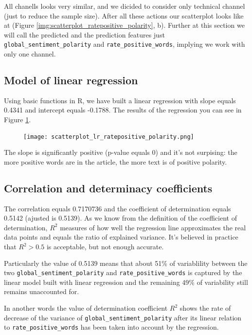 All chanells looks very similar, and we dicided to consider only technical channel (just to reduce the sample size). After all these actions our scatterplot looks like at (Figure \ref{img:scatterplot_ratepositive_polarity}, b). Further at this section we will call the predicted and the prediction features just \texttt{global\_sentiment\_polarity} and \texttt{rate\_positive\_words}, implying we work with only one channel.
 
\subsection{Model of linear regression}

Using basic functions in R, we have built a linear regression with slope equals 0.4341 and intercept equals  -0.1788. The results of the regression you can see in Figure \ref{img:scatterplot_lr_ratepositive_polarity}.

\begin{figure}[h!]
 \begin{center}
    \center \texttt{[image: scatterplot\_lr\_ratepositive\_polarity.png]}
   \caption{}
   \label{img:scatterplot_lr_ratepositive_polarity}
 \end{center}
\end{figure} 

The slope is significantly positive (p-value equals 0) and it's not surpising: the more positive words are in the article, the more text is of positive polarity.

\subsection{Correlation and determinacy coefficients}

The correlation equals 0.7170736 and the coefficient of determination equals 0.5142 (ajusted is 0.5139). As we know from the definition of the coefficient of determination, $R^2$ measures of how well the regression line approximates the real data points and equals the ratio of explained variance. It's believed in practice that $R^2 > 0.5$ is acceptable, but not enough accurate. 

Particularly the value of 0.5139 means that about 51\% of variablility between the two   \texttt{global\_sentiment\_polarity} and \texttt{rate\_positive\_words} is captured by the linear model built with linear regression and the remaining 49\% of variability still remains unaccounted for. 

In another words the value of determination coefficient $R^2$ shows the rate of decrease of the variance of \texttt{global\_sentiment\_polarity} after its linear relation to \texttt{rate\_positive\_words} has been taken into account by the regression.


